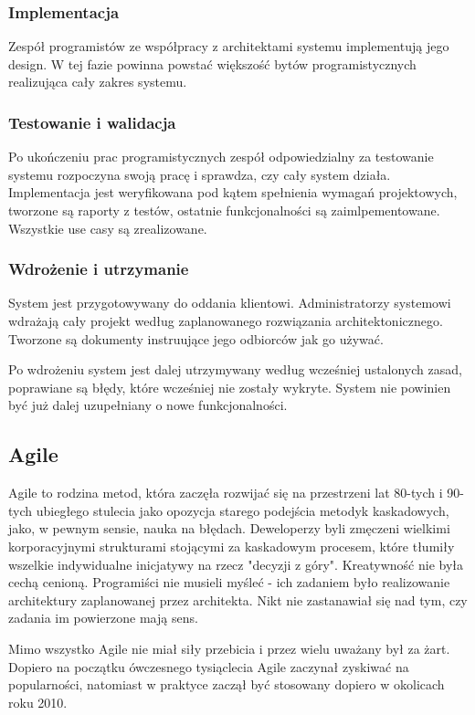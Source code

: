 \documentclass{article}
\begin{document}
\subsubsection*{Implementacja}
Zespół programistów ze współpracy z architektami systemu implementują jego design. W tej fazie powinna powstać większość bytów programistycznych realizująca cały zakres systemu.

\subsubsection*{Testowanie i walidacja}
Po ukończeniu prac programistycznych zespół odpowiedzialny za testowanie systemu rozpoczyna swoją pracę i sprawdza, czy cały system działa. Implementacja jest weryfikowana pod kątem spełnienia wymagań projektowych, tworzone są raporty z testów, ostatnie funkcjonalności są zaimlpementowane. Wszystkie use casy są zrealizowane.

\subsubsection*{Wdrożenie i utrzymanie}
System jest przygotowywany do oddania klientowi. Administratorzy systemowi wdrażają cały projekt według zaplanowanego rozwiązania architektonicznego. Tworzone są dokumenty instruujące jego odbiorców jak go używać.

Po wdrożeniu system jest dalej utrzymywany według wcześniej ustalonych zasad, poprawiane są błędy, które wcześniej nie zostały wykryte. System nie powinien być już dalej uzupełniany o nowe funkcjonalności.

\subsection{Agile}
Agile to rodzina metod, która zaczęła rozwijać się na przestrzeni lat 80-tych i 90-tych ubiegłego stulecia jako opozycja starego podejścia metodyk kaskadowych\cite{scrum}, jako, w pewnym sensie, nauka na błędach. Deweloperzy byli zmęczeni wielkimi korporacyjnymi strukturami stojącymi za kaskadowym procesem, które tłumiły wszelkie indywidualne inicjatywy na rzecz "decyzji z góry". Kreatywność nie była cechą cenioną. Programiści nie musieli myśleć - ich zadaniem było realizowanie architektury zaplanowanej przez architekta. Nikt nie zastanawiał się nad tym, czy zadania im powierzone mają sens.

Mimo wszystko Agile nie miał siły przebicia i przez wielu uważany był za żart. Dopiero na początku ówczesnego tysiąclecia Agile zaczynał zyskiwać na popularności, natomiast w praktyce zaczął być stosowany dopiero w okolicach roku 2010.
\end{document}
